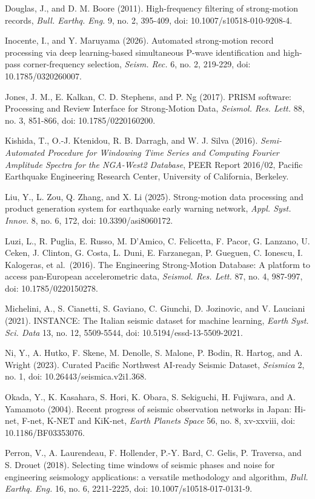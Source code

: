 \documentclass[12pt,letterpaper]{article}
\begin{document}
Douglas, J., and D. M. Boore (2011). High-frequency filtering of strong-motion records, \emph{Bull. Earthq. Eng.} 9, no. 2, 395-409, doi: 10.1007/s10518-010-9208-4.

Inocente, I., and Y. Maruyama (2026). Automated strong-motion record processing via deep learning-based simultaneous P-wave identification and high-pass corner-frequency selection, \emph{Seism. Rec.} 6, no. 2, 219-229, doi: 10.1785/0320260007.

Jones, J. M., E. Kalkan, C. D. Stephens, and P. Ng (2017). PRISM software: Processing and Review Interface for Strong-Motion Data, \emph{Seismol. Res. Lett.} 88, no. 3, 851-866, doi: 10.1785/0220160200.

Kishida, T., O.-J. Ktenidou, R. B. Darragh, and W. J. Silva (2016). \emph{Semi-Automated Procedure for Windowing Time Series and Computing Fourier Amplitude Spectra for the NGA-West2 Database}, PEER Report 2016/02, Pacific Earthquake Engineering Research Center, University of California, Berkeley.

Liu, Y., L. Zou, Q. Zhang, and X. Li (2025). Strong-motion data processing and product generation system for earthquake early warning network, \emph{Appl. Syst. Innov.} 8, no. 6, 172, doi: 10.3390/asi8060172.

Luzi, L., R. Puglia, E. Russo, M. D'Amico, C. Felicetta, F. Pacor, G. Lanzano, U. Ceken, J. Clinton, G. Costa, L. Duni, E. Farzanegan, P. Gueguen, C. Ionescu, I. Kalogeras, et al.~(2016). The Engineering Strong-Motion Database: A platform to access pan-European accelerometric data, \emph{Seismol. Res. Lett.} 87, no. 4, 987-997, doi: 10.1785/0220150278.

Michelini, A., S. Cianetti, S. Gaviano, C. Giunchi, D. Jozinovic, and V. Lauciani (2021). INSTANCE: The Italian seismic dataset for machine learning, \emph{Earth Syst. Sci. Data} 13, no. 12, 5509-5544, doi: 10.5194/essd-13-5509-2021.

Ni, Y., A. Hutko, F. Skene, M. Denolle, S. Malone, P. Bodin, R. Hartog, and A. Wright (2023). Curated Pacific Northwest AI-ready Seismic Dataset, \emph{Seismica} 2, no. 1, doi: 10.26443/seismica.v2i1.368.

Okada, Y., K. Kasahara, S. Hori, K. Obara, S. Sekiguchi, H. Fujiwara, and A. Yamamoto (2004). Recent progress of seismic observation networks in Japan: Hi-net, F-net, K-NET and KiK-net, \emph{Earth Planets Space} 56, no. 8, xv-xxviii, doi: 10.1186/BF03353076.

Perron, V., A. Laurendeau, F. Hollender, P.-Y. Bard, C. Gelis, P. Traversa, and S. Drouet (2018). Selecting time windows of seismic phases and noise for engineering seismology applications: a versatile methodology and algorithm, \emph{Bull. Earthq. Eng.} 16, no. 6, 2211-2225, doi: 10.1007/s10518-017-0131-9.
\end{document}
